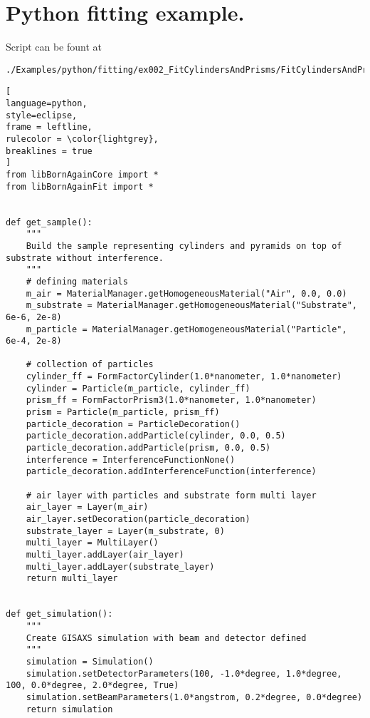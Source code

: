 %
\newpage
\section{Python fitting example.} \label{PythonFittingExampleScript}

Script can be fount at
\begin{lstlisting}[language=shell, style=commandline]
./Examples/python/fitting/ex002_FitCylindersAndPrisms/FitCylindersAndPrisms.py
\end{lstlisting}

\begin{lstlisting}[
language=python, 
style=eclipse, 
frame = leftline, 
rulecolor = \color{lightgrey},
breaklines = true
]
from libBornAgainCore import *
from libBornAgainFit import *


def get_sample():
    """
    Build the sample representing cylinders and pyramids on top of substrate without interference.
    """
    # defining materials
    m_air = MaterialManager.getHomogeneousMaterial("Air", 0.0, 0.0)
    m_substrate = MaterialManager.getHomogeneousMaterial("Substrate", 6e-6, 2e-8)
    m_particle = MaterialManager.getHomogeneousMaterial("Particle", 6e-4, 2e-8)

    # collection of particles
    cylinder_ff = FormFactorCylinder(1.0*nanometer, 1.0*nanometer)
    cylinder = Particle(m_particle, cylinder_ff)
    prism_ff = FormFactorPrism3(1.0*nanometer, 1.0*nanometer)
    prism = Particle(m_particle, prism_ff)
    particle_decoration = ParticleDecoration()
    particle_decoration.addParticle(cylinder, 0.0, 0.5)
    particle_decoration.addParticle(prism, 0.0, 0.5)
    interference = InterferenceFunctionNone()
    particle_decoration.addInterferenceFunction(interference)

    # air layer with particles and substrate form multi layer
    air_layer = Layer(m_air)
    air_layer.setDecoration(particle_decoration)
    substrate_layer = Layer(m_substrate, 0)
    multi_layer = MultiLayer()
    multi_layer.addLayer(air_layer)
    multi_layer.addLayer(substrate_layer)
    return multi_layer


def get_simulation():
    """
    Create GISAXS simulation with beam and detector defined
    """
    simulation = Simulation()
    simulation.setDetectorParameters(100, -1.0*degree, 1.0*degree, 100, 0.0*degree, 2.0*degree, True)
    simulation.setBeamParameters(1.0*angstrom, 0.2*degree, 0.0*degree)
    return simulation



\end{lstlisting}
